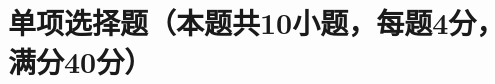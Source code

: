 \documentclass{CWNUExam}
\author{西华师范大学}
\begin{document}
\maketitle

\section{单项选择题（本题共10小题，每题4分，满分40分）}

\begin{problem}

\paren[]
\begin{choices}
	\item
	\item
	\item
	\item
\end{choices}
\end{problem}

\begin{problem}

\paren[]
\begin{choices}
	\item
	\item
	\item
	\item
\end{choices}
\end{problem}

\begin{problem}

\paren[]
\begin{choices}
	\item
	\item
	\item
	\item
\end{choices}
\end{problem}

\begin{problem}

\paren[]
\begin{choices}
	\item
	\item
	\item
	\item
\end{choices}
\end{problem}

\begin{problem}

\paren[]
\begin{choices}
	\item
	\item
	\item
	\item
\end{choices}
\end{problem}
\end{document}
